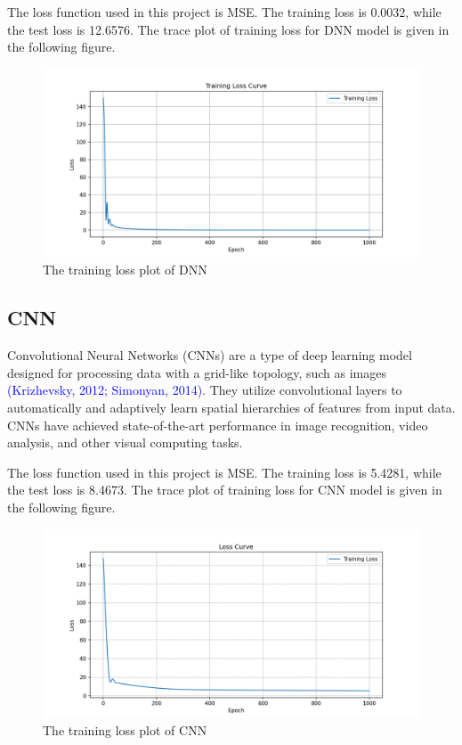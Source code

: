 \documentclass[sn-mathphys-num]{sn-jnl}%
\theoremstyle{thmstyleone}%
\theoremstyle{thmstyletwo}%
\theoremstyle{thmstylethree}%
\begin{document}
The loss function used in this project is MSE. The training loss is 0.0032, while the test loss is 
12.6576. The trace plot of training loss for DNN model is given in the following figure.
\begin{figure}[H]
    \centering
    \includegraphics[width=\textwidth]{figure/DNN_loss.png}
    \caption{The training loss plot of DNN}
\end{figure}



\subsection{CNN}

Convolutional Neural Networks (CNNs) are a type of deep learning model designed for processing data with a grid-like topology, such as images \textcolor{blue}{(Krizhevsky, 2012; Simonyan, 2014)}. They utilize convolutional layers to automatically and adaptively learn spatial hierarchies of features from input data. CNNs have achieved state-of-the-art performance in image recognition, video analysis, and other visual computing tasks.

The loss function used in this project is MSE. The training loss is  5.4281, while the test loss is 
8.4673. The trace plot of training loss for CNN model is given in the following figure.
\begin{figure}[H]
    \centering
    \includegraphics[width=\textwidth]{figure/CNN_loss.png}
    \caption{The training loss plot of CNN}
\end{figure}
\end{document}
